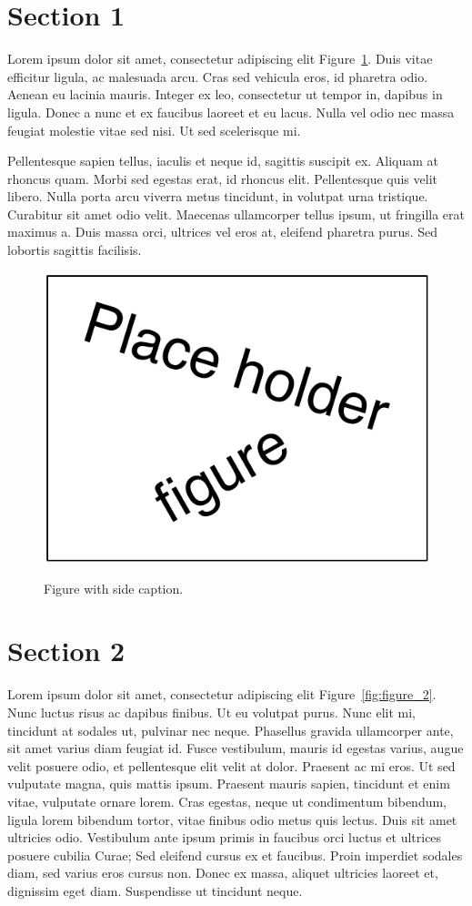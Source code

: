 \section{Section 1}
Lorem ipsum dolor sit amet, consectetur adipiscing elit Figure~\ref{fig:figure_1}. Duis vitae efficitur ligula, ac malesuada arcu. Cras sed vehicula eros, id pharetra odio. Aenean eu lacinia mauris. Integer ex leo, consectetur ut tempor in, dapibus in ligula. Donec a nunc et ex faucibus laoreet et eu lacus. Nulla vel odio nec massa feugiat molestie vitae sed nisi. Ut sed scelerisque mi.

Pellentesque sapien tellus, iaculis et neque id, sagittis suscipit ex. Aliquam at rhoncus quam. Morbi sed egestas erat, id rhoncus elit. Pellentesque quis velit libero. Nulla porta arcu viverra metus tincidunt, in volutpat urna tristique. Curabitur sit amet odio velit. Maecenas ullamcorper tellus ipsum, ut fringilla erat maximus a. Duis massa orci, ultrices vel eros at, eleifend pharetra purus. Sed lobortis sagittis facilisis.

\begin{figure}
	\fcapside
	{\caption{Figure with side caption.}\label{fig:figure_1}}
	{\includegraphics[width=0.5\linewidth]{figures/results/place_holder}}
\end{figure}

\section{Section 2}
Lorem ipsum dolor sit amet, consectetur adipiscing elit Figure~\ref{fig:figure_2}. Nunc luctus risus ac dapibus finibus. Ut eu volutpat purus. Nunc elit mi, tincidunt at sodales ut, pulvinar nec neque. Phasellus gravida ullamcorper ante, sit amet varius diam feugiat id. Fusce vestibulum, mauris id egestas varius, augue velit posuere odio, et pellentesque elit velit at dolor. Praesent ac mi eros. Ut sed vulputate magna, quis mattis ipsum. Praesent mauris sapien, tincidunt et enim vitae, vulputate ornare lorem. Cras egestas, neque ut condimentum bibendum, ligula lorem bibendum tortor, vitae finibus odio metus quis lectus. Duis sit amet ultricies odio. Vestibulum ante ipsum primis in faucibus orci luctus et ultrices posuere cubilia Curae; Sed eleifend cursus ex et faucibus. Proin imperdiet sodales diam, sed varius eros cursus non. Donec ex massa, aliquet ultricies laoreet et, dignissim eget diam. Suspendisse ut tincidunt neque.

